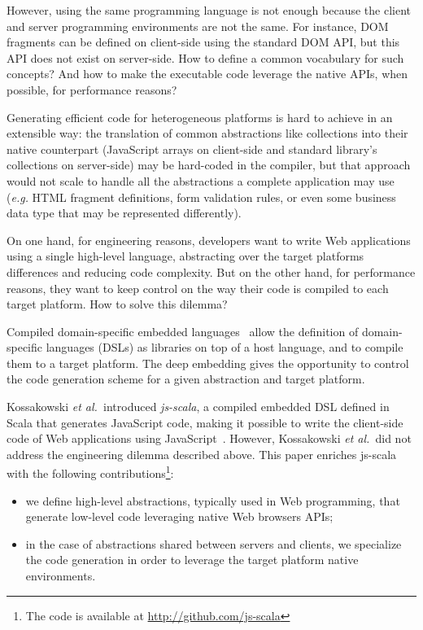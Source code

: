\documentclass[preprint]{sigplanconf}
\newcommand{\eg}{\emph{e.g.}}
\newcommand{\etal}{\emph{et al.~}}
\begin{document}
However, using the same programming language is not enough because the client and server programming
environments are not the same. For instance, DOM fragments can be defined on client-side using the
standard DOM API, but this API does not exist on server-side. How to define a common vocabulary for
such concepts? And how to make the executable code leverage the native APIs, when possible, for
performance reasons?

Generating efficient code for heterogeneous platforms is hard to achieve in an extensible way: the
translation of common abstractions like collections into their native counterpart (JavaScript arrays
on client-side and standard library's collections on server-side) may be hard-coded in the compiler,
but that approach would not scale to handle all the abstractions a complete application may use (\eg
HTML fragment definitions, form validation rules, or even some business data type that may be
represented differently).

On one hand, for engineering reasons, developers want to write Web applications using a single
high-level language, abstracting over the target platforms differences and reducing code complexity.
But on the other hand, for performance reasons, they want to keep control on the way their code is
compiled to each target platform. How to solve this dilemma?

Compiled domain-specific embedded languages~\cite{Elliott2003_Compiling} allow the definition of
domain-specific languages (DSLs) as libraries on top of a host language, and to compile them to a
target platform. The deep embedding gives the opportunity to control the code generation scheme for
a given abstraction and target platform.

Kossakowski \etal introduced \emph{js-scala}, a compiled embedded DSL defined in Scala that
generates JavaScript code, making it possible to write the client-side code of Web applications
using JavaScript~\cite{Kossakowski12_JsDESL}. However, Kossakowski \etal did not address the
engineering dilemma described above. This paper enriches js-scala with the following
contributions\footnote{The code is available at
\href{http://github.com/js-scala}{http://github.com/js-scala}}:

\begin{itemize}
 \item we define high-level abstractions, typically used in Web programming, that generate low-level
code leveraging native Web browsers APIs;
 \item in the case of abstractions shared between servers and clients, we specialize the code
generation in order to leverage the target platform native environments.
\end{itemize}
\end{document}
